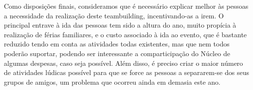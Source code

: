 Como disposições finais, consideramos que é necessário explicar melhor às pessoas a necessidade da realização deste teambuilding, incentivando-as a irem. O principal entrave à ida das pessoas tem sido a altura do ano, muito propícia à realização de férias familiares, e o custo associado à ida ao evento, que é bastante reduzido tendo em conta as atividades todas existentes, mas que nem todos poderão suportar, podendo ser interessante a comparticipação do Núcleo de algumas despesas, caso seja possível. Além disso, é preciso criar o maior número de atividades lúdicas possível para que se force as pessoas a separarem-se dos seus grupos de amigos, um problema que ocorreu ainda em demasia este ano.